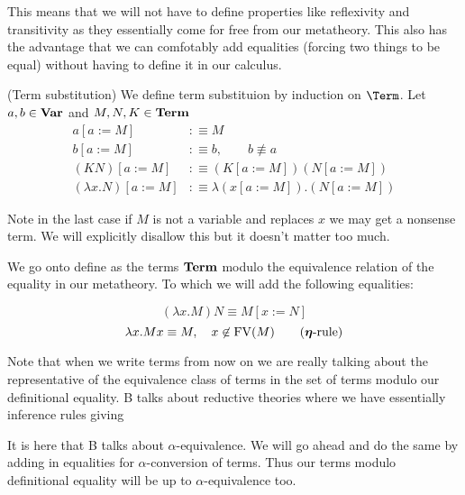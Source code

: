 This means that we will not have to define properties like reflexivity and transitivity as they essentially come for free from our metatheory. This also has the advantage that we can comfotably add equalities (forcing two things to be equal) without having to define it in our calculus.

\begin{defin}(Term substitution)
    We define term substituion by induction on $\Term$. Let $a,b \in \mathbf{Var}$ and $M,N,K \in \mathbf{Term}$
    \[\begin{aligned}
        a[a := M] &:\equiv M \\
        b[a := M] &:\equiv b, \qquad b \not\equiv a \\
        (K N)[a := M] &:\equiv (K[a:=M])(N[a:=M]) \\
        (\lambda x . N)[a := M] &:\equiv \lambda (x[a := M]) . (N[a := M])
    \end{aligned}\]
    
    Note in the last case if $M$ is not a variable and replaces $x$ we may get a nonsense term. We will explicitly disallow this but it doesn't matter too much.
\end{defin}

We go onto define \utbe  as the terms $\mathbf{Term}$ modulo the equivalence relation of the equality in our metatheory. To which we will add the following equalities:

\[(\lambda x . M) N \equiv M[x := N]\tag{$\boldsymbol \beta$-rule}\]
\[\lambda x . M x \equiv M, \quad x \not\in \mathrm{FV}(M)\tag{$\boldsymbol \eta$-rule}\]

Note that when we write terms from now on we are really talking about the representative of the equivalence class of terms in the set of terms modulo our definitional equality. B talks about reductive theories where we have essentially inference rules giving 


\begin{remark}
It is here that B talks about $\alpha$-equivalence. We will go ahead and do the same by adding in equalities for $\alpha$-conversion of terms. Thus our terms modulo definitional equality will be up to $\alpha$-equivalence too.
\end{remark}

